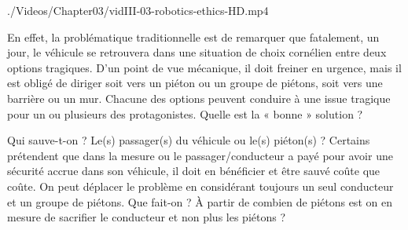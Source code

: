 \begin{marginvideo}
		{./Videos/Chapter03/vidIII-03-robotics-ethics-HD.mp4}%
\end{marginvideo}

En effet, la problématique traditionnelle est de remarquer que fatalement, un jour, le véhicule se retrouvera dans une situation de choix cornélien entre deux options tragiques. D'un point de vue mécanique, il doit freiner en urgence, mais il est obligé de diriger soit vers un piéton ou un groupe de piétons, soit vers une barrière ou un mur. Chacune des options peuvent conduire à une issue tragique pour un ou plusieurs des protagonistes. Quelle est la « bonne » solution ?

Qui sauve-t-on ? Le(s) passager(s) du véhicule ou le(s) piéton(s) ? Certains prétendent que dans la mesure ou le passager/conducteur a payé pour avoir une sécurité accrue dans son véhicule, il doit en bénéficier et être sauvé coûte que coûte. On peut déplacer le problème en considérant toujours un seul conducteur et un groupe de piétons. Que fait-on ? À partir de combien de piétons est on en mesure de sacrifier le conducteur et non plus les piétons ? 

